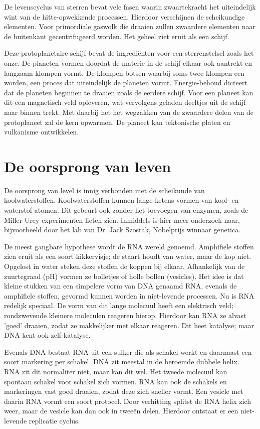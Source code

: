 \documentclass{article}
\begin{document}
        De levenscyclus van sterren bevat vele fasen waarin zwaartekracht het uiteindelijk wint van de hitte-opwekkende processen. Hierdoor verschijnen de scheikundige elementen. Voor primordiale gaswolk die draaien zullen zwaardere elementen naar de buitenkant gecentrifugeerd worden. Het geheel ziet eruit als een schijf.   
        
        Deze protoplanetaire schijf bevat de ingredi\"enten voor een sterrenstelsel zoals het onze. De planeten vormen doordat de materie in de schijf elkaar ook aantrekt en langzaam klompen vormt. De klompen botsen waarbij soms twee klompen een worden, een proces dat uiteindelijk de planeten vormt. Energie-behoud dicteert dat de planeten beginnen te draaien zoals de eerdere schijf. Voor een planeet kan dit een magnetisch veld opleveren, wat vervolgens geladen deeltjes uit de schijf naar binnen trekt. Met daarbij het het wegzakken van de zwaardere delen van de protoplaneet zal de kern opwarmen. De planeet kan tektonische platen en vulkanisme ontwikkelen.
    
    \section{De oorsprong van leven}
        De oorsprong van level is innig verbonden met de scheikunde van koolwaterstoffen. Koolwaterstoffen kunnen lange ketens vormen van kool- en waterstof atomen. Dit gebeurt ook zonder het toevoegen van enzymen, zoals de Miller-Urey experimenten lieten zien. Inmiddels is hier meer onderzoek naar, bijvoorbeeld door het lab van Dr. Jack Szostak, Nobelprijs winnaar genetica. 
        
        De meest gangbare hypothese wordt de RNA wereld genoemd. Amphifiele stoffen zien eruit als een soort kikkervisje; de staart houdt van water, maar de kop niet. Opgelost in water steken deze stoffen de koppen bij elkaar. Afhankelijk van de zuurtegraad (pH) vormen ze bolletjes of holle bollen (vesicles). Het idee is dat kleine stukken van een simpelere vorm van DNA genaamd RNA, evenals de amphifiele stoffen, gevormd kunnen worden in niet-levende processen. Nu is RNA redelijk speciaal. De vorm van dit lange molecuul heeft een elektrisch veld; rondzwevende kleinere moleculen reageren hierop. Hierdoor kan RNA ze alvast 'goed' draaien, zodat ze makkelijker met elkaar reageren. Dit heet katalyse; maar DNA kent ook zelf-katalyse. 
        
        Evenals DNA bestaat RNA uit een suiker die als schakel werkt en daarnaast een soort markering per schakel. DNA zit meestal in de beroemde dubbele helix. RNA zit dit normaliter niet, maar kan dit wel. Het tweede molecuul kan spontaan schakel voor schakel zich vormen. RNA kan ook de schakels en markeringen vast goed draaien, zodat deze zich sneller vormt. Een vesicle met daarin RNA vormt een soort protocel. Door verhitting splitst de RNA helix zich weer, maar de vesicle kan dan ook in twee\"en delen. Hierdoor ontstaat er een niet-levende replicatie cyclus.
        
\end{document}
